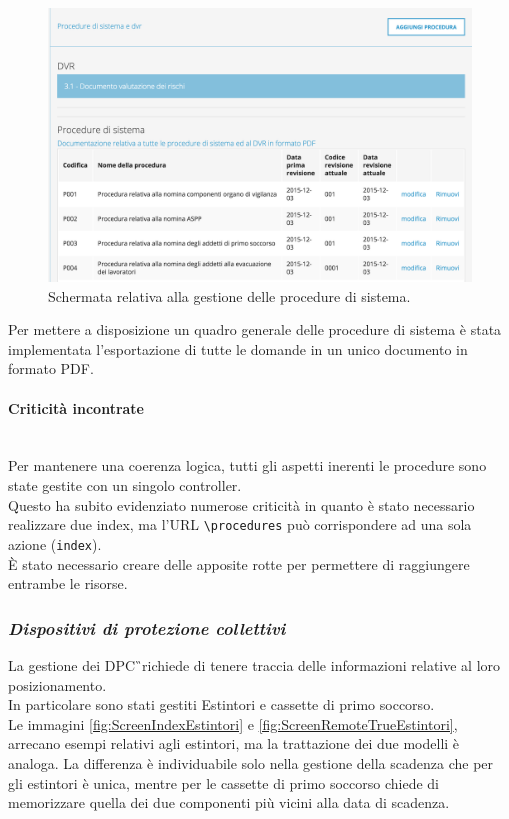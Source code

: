 			\begin{figure}[H]
				\begin{center}
					\includegraphics[width=14cm]{Pics/ScreenDVR.png}
					\caption{Schermata relativa alla gestione delle procedure di sistema.}
					\label{fig:ScreenDVR}
				\end{center}
			\end{figure}
			Per mettere a disposizione un quadro generale delle procedure di sistema è stata implementata l'esportazione di tutte le domande in un unico documento in formato PDF.

	\paragraph*{Criticità incontrate}\mbox{}\\
		Per mantenere una coerenza logica, tutti gli aspetti inerenti le procedure sono state gestite con un singolo controller.\\
		Questo ha subito evidenziato numerose criticità in quanto è stato necessario realizzare due index, ma l'URL \texttt{\textbackslash procedures} può corrispondere ad una sola azione (\texttt{index}).\\
		È stato necessario creare delle apposite rotte per permettere di raggiungere entrambe le risorse.
\newpage
\subsubsection{\textit{Dispositivi di protezione collettivi}}
La gestione dei \gls{DPC}\G\ richiede di tenere traccia delle informazioni relative al loro posizionamento. \\
In particolare sono stati gestiti Estintori e cassette di primo soccorso. \\
Le immagini \autoref{fig:ScreenIndexEstintori} e \autoref{fig:ScreenRemoteTrueEstintori}, arrecano esempi relativi agli estintori, ma la trattazione dei due modelli è analoga. La differenza è individuabile solo nella gestione della scadenza che per gli estintori è unica, mentre per le cassette di primo soccorso chiede di memorizzare quella dei due componenti più vicini alla data di scadenza.

